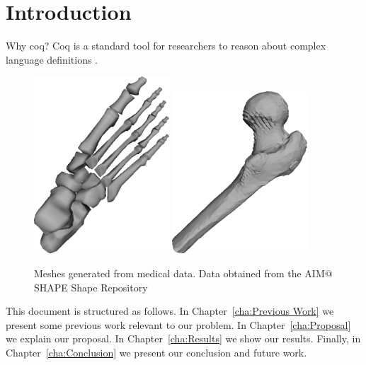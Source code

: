 
\chapter{Introduction}
Why coq? Coq is a standard tool for researchers to reason about complex language definitions \cite{Pierce:SF1}.


\begin{figure}
\centering
\includegraphics[width=0.45\textwidth]{pictures/image01.png}
\includegraphics[width=0.45\textwidth]{pictures/image02.png}
\caption{Meshes generated from medical data. Data obtained from the AIM$@$SHAPE Shape Repository \cite{AIMSHAPE}}
\label{fig:example}
\end{figure}


This document is structured as follows. In Chapter~\ref{cha:Previous Work} we present some previous work relevant to our problem. In Chapter~\ref{cha:Proposal} we explain our proposal. In Chapter~\ref{cha:Results} we show our results. Finally, in Chapter~\ref{cha:Conclusion} we present our conclusion and future work.


